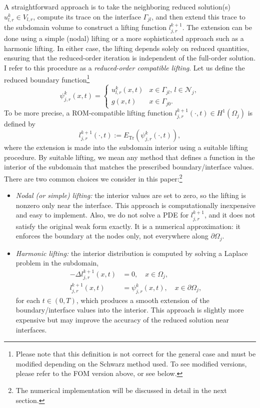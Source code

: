\documentclass[a4paper, 11pt]{article}
\theoremstyle{remark}
\begin{document}
A straightforward approach is to take the neighboring reduced solution(s) $u_{l, r}^k \in V_{l,r}$, compute its trace on the interface $\Gamma_{jl}$, and then extend this trace to the subdomain volume to construct a lifting function $l_{j, r}^{k+1}$. The extension can be done using a simple (nodal) lifting or a more sophisticated approach such as a harmonic lifting. In either case, the lifting depends solely on reduced quantities, ensuring that the reduced-order iteration is independent of the full-order solution. I refer to this procedure as a \emph{reduced-order compatible lifting}. Let us define the reduced boundary function\footnote{Please note that this definition is not correct for the general case and must be modified depending on the Schwarz method used. To see modified versions, please refer to the FOM version above, or see below.}
\begin{equation*}
    \psi_{j, r}^{k}(x, t) = 
    \begin{cases}
        u_{l, r}^{k}(x, t) & x\in \Gamma_{jl},\, l\in \mathcal{N}_{j},\\
        g(x, t) & x\in \Gamma_{j0}.
    \end{cases}
\end{equation*}
To be more precise, a ROM-compatible lifting function $l_{j, r}^{k+1}(\cdot, t)\in H^{1}(\Omega_{j})$ is defined by
\begin{equation*}
    l_{j, r}^{k+1}(\cdot, t) := E_{\text{Tr}}(\psi_{j, r}^{k}(\cdot, t)),
\end{equation*}
where the extension is made into the subdomain interior using a suitable lifting procedure. By suitable lifting, we mean any method that defines a function in the interior of the subdomain that matches the prescribed boundary/interface values. There are two common choices we consider in this paper:\footnote{The numerical implementation will be discussed in detail in the next section.}
\begin{itemize}
    \item[--] \textit{Nodal (or simple) lifting:} the interior values are set to zero, so the lifting is nonzero only near the interface. This approach is computationally inexpensive and easy to implement. Also, we do not solve a PDE for $l^{k+1}_{j, r}$, and it does not satisfy the original weak form exactly. It is a numerical approximation: it enforces the boundary at the nodes only, not everywhere along $\partial\Omega_{j}$.
    \item[--] \textit{Harmonic lifting:} the interior distribution is computed by solving a Laplace problem in the subdomain, 
    \begin{align*}
        -\Delta l^{k+1}_{j, r}(x, t) &= 0, \quad x\in\Omega_j,\\
        l_{j, r}^{k+1}(x, t) &= \psi_{j, r}^{k}(x, t), \quad x\in \partial\Omega_j,
    \end{align*}
    for each $t\in (0, T)$, which produces a smooth extension of the boundary/interface values into the interior. This approach is slightly more expensive but may improve the accuracy of the reduced solution near interfaces.
\end{itemize}
\end{document}
